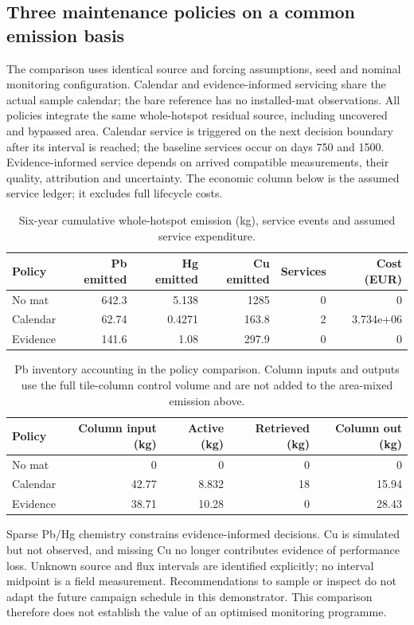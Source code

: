 \subsection{Three maintenance policies on a common emission basis}
The comparison uses identical source and forcing assumptions, seed and nominal monitoring configuration. Calendar and evidence-informed servicing share the actual sample calendar; the bare reference has no installed-mat observations. All policies integrate the same whole-hotspot residual source, including uncovered and bypassed area. Calendar service is triggered on the next decision boundary after its interval is reached; the baseline services occur on days 750 and 1500. Evidence-informed service depends on arrived compatible measurements, their quality, attribution and uncertainty. The economic column below is the assumed service ledger; it excludes full lifecycle costs.
\begin{table}[htbp]\centering\small
\caption{Six-year cumulative whole-hotspot emission (kg), service events and assumed service expenditure.}\label{tab:policies}
\begin{tabular}{lrrrrr}\toprule
Policy & Pb emitted & Hg emitted & Cu emitted & Services & Cost (EUR) \\
\midrule
No mat & 642.3 & 5.138 & 1285 & 0 & 0 \\
Calendar & 62.74 & 0.4271 & 163.8 & 2 & 3.734e+06 \\
Evidence & 141.6 & 1.08 & 297.9 & 0 & 0 \\
\bottomrule\end{tabular}\end{table}

\begin{table}[htbp]\centering\small
\caption{Pb inventory accounting in the policy comparison. Column inputs and outputs use the full tile-column control volume and are not added to the area-mixed emission above.}\label{tab:policy-ledger}
\begin{tabular}{lrrrr}\toprule
Policy & Column input (kg) & Active (kg) & Retrieved (kg) & Column out (kg) \\
\midrule
No mat & 0 & 0 & 0 & 0 \\
Calendar & 42.77 & 8.832 & 18 & 15.94 \\
Evidence & 38.71 & 10.28 & 0 & 28.43 \\
\bottomrule\end{tabular}\end{table}

Sparse Pb/Hg chemistry constrains evidence-informed decisions. Cu is simulated but not observed, and missing Cu no longer contributes evidence of performance loss. Unknown source and flux intervals are identified explicitly; no interval midpoint is a field measurement. Recommendations to sample or inspect do not adapt the future campaign schedule in this demonstrator. This comparison therefore does not establish the value of an optimised monitoring programme.

